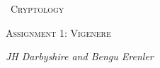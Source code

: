 \begin{titlepage}
	\centering
	\vspace{3cm}
	{\scshape\Huge\ Cryptology \par}
	\vspace{3cm}
	{\scshape\Large Assignment 1: Vigenere\par}

	\vfill
	{\Large\itshape JH Darbyshire and Bengu Erenler}
\end{titlepage}